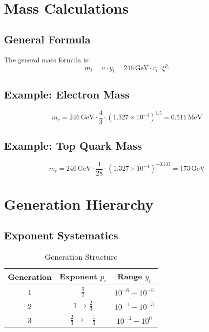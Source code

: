 \documentclass[12pt,a4paper]{article}
\newcommand{\xigeom}{\xi}
\begin{document}
	\section{Mass Calculations}
	
	\subsection{General Formula}
	
	The general mass formula is:
	\begin{equation}
		m_i = v \cdot y_i = 246\,\text{GeV} \cdot r_i \cdot \xigeom^{p_i}
	\end{equation}
	
	\subsection{Example: Electron Mass}
	
	\begin{equation}
		m_e = 246\,\text{GeV} \cdot \frac{4}{3} \cdot (1.327 \times 10^{-4})^{1.5} = 0.511\,\text{MeV}
	\end{equation}
	
	\subsection{Example: Top Quark Mass}
	
	\begin{equation}
		m_t = 246\,\text{GeV} \cdot \frac{1}{28} \cdot (1.327 \times 10^{-4})^{-0.333} = 173\,\text{GeV}
	\end{equation}
	
	\section{Generation Hierarchy}
	
	\subsection{Exponent Systematics}
	
	\begin{table}[H]
		\centering
		\caption{Generation Structure}
		\begin{tabular}{@{}ccc@{}}
			\toprule
			\textbf{Generation} & \textbf{Exponent} $p_i$ & \textbf{Range} $y_i$ \\
			\midrule
			1 & $\frac{3}{2}$ & $10^{-6} - 10^{-5}$ \\
			2 & $1 \rightarrow \frac{2}{3}$ & $10^{-4} - 10^{-3}$ \\
			3 & $\frac{2}{3} \rightarrow -\frac{1}{3}$ & $10^{-3} - 10^0$ \\
			\bottomrule
		\end{tabular}
	\end{table}
	
\end{document}
